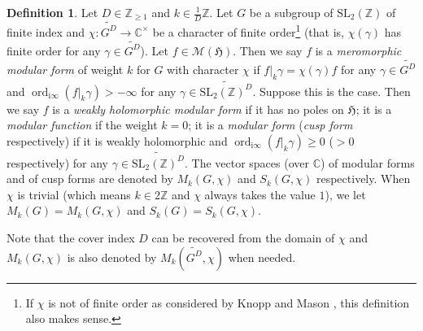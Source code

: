 \documentclass[12pt]{amsart}
\numberwithin{equation}{section}
\theoremstyle{plain}
\theoremstyle{definition}
\newtheorem{deff}[thm]{Definition}
\theoremstyle{remark}
\newcommand\rmi{\mathrm{i}}
\newcommand\ord{\mathop{\mathrm{ord}}}
\newcommand\numZ{\mathbb{Z}}
\newcommand\numC{\mathbb{C}}
\newcommand\numgeq[2]{\mathbb{#1}_{\geq #2}}
\newcommand\slZ{\mathrm{SL}_2(\mathbb{Z})}
\newcommand\uhp{\mathfrak{H}}
\newcommand\Dcover[2]{\widetilde{#1^{#2}}}
\begin{document}
\begin{deff}
\label{deff:modularForm}
Let $D\in\numgeq{Z}{1}$ and $k\in\frac{1}{D}\numZ$. Let $G$ be a subgroup of $\slZ$ of finite index and $\chi\colon\Dcover{G}{D}\rightarrow\numC^\times$ be a character of finite order\footnote{If $\chi$ is not of finite order as considered by Knopp and Mason \cite{KM03}, this definition also makes sense.} (that is, $\chi(\gamma)$ has finite order for any $\gamma\in\Dcover{G}{D}$). Let $f\in\mathscr{M}(\uhp)$. Then we say $f$ is a \emph{meromorphic modular form} of weight $k$ for $G$ with character $\chi$ if $f\vert_k\gamma=\chi(\gamma)f$ for any $\gamma\in\Dcover{G}{D}$ and $\ord_{\rmi\infty}(f\vert_k\gamma)>-\infty$ for any $\gamma\in\Dcover{\slZ}{D}$. Suppose this is the case. Then we say $f$ is a \emph{weakly holomorphic modular form} if it has no poles on $\uhp$; it is a \emph{modular function} if the weight $k=0$; it is a \emph{modular form} (\emph{cusp form} respectively) if it is weakly holomorphic and $\ord_{\rmi\infty}(f\vert_k\gamma)\geq 0$ ($>0$ respectively) for any $\gamma\in\Dcover{\slZ}{D}$. The vector spaces (over $\numC$) of modular forms and of cusp forms are denoted by $M_k(G,\chi)$ and $S_k(G,\chi)$ respectively. When $\chi$ is trivial (which means $k\in2\numZ$ and $\chi$ always takes the value $1$), we let $M_k(G)=M_k(G,\chi)$ and $S_k(G)=S_k(G,\chi)$.
\end{deff}

Note that the cover index $D$ can be recovered from the domain of $\chi$ and $M_k(G,\chi)$ is also denoted by $M_k(\Dcover{G}{D},\chi)$ when needed.
\end{document}
